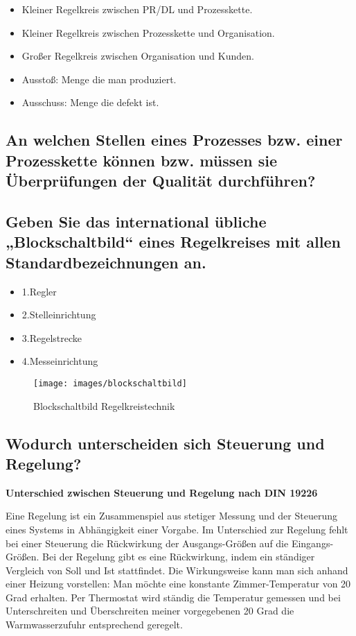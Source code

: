 	\begin{itemize}
		\item Kleiner Regelkreis zwischen PR/DL und Prozesskette.
		\item Kleiner Regelkreis zwischen Prozesskette und Organisation.
		\item Großer Regelkreis zwischen  Organisation und Kunden.
	\end{itemize}
	
	\begin{itemize}
		\item Ausstoß: Menge die man produziert.
		\item Ausschuss: Menge die defekt ist.
	\end{itemize}

	\subsection{An welchen Stellen eines Prozesses bzw. einer Prozesskette können bzw. müssen sie Überprüfungen der Qualität durchführen?}

	\subsection{Geben Sie das international übliche „Blockschaltbild“ eines Regelkreises mit allen Standardbezeichnungen an.}
	
	\begin{itemize}
		\item 1.Regler
		\item 2.Stelleinrichtung
		\item 3.Regelstrecke
		\item 4.Messeinrichtung
	\end{itemize}
	\begin{figure}[!h]
		\begin{center}
			\texttt{[image: images/blockschaltbild]}
			\caption{Blockschaltbild Regelkreistechnik}
		\end{center}
	\end{figure}

	\subsection{Wodurch unterscheiden sich Steuerung und Regelung?}

	\textbf{Unterschied zwischen Steuerung und Regelung nach DIN 19226 }
	
	Eine Regelung ist ein Zusammenspiel aus stetiger Messung und der Steuerung eines Systems in Abhängigkeit einer Vorgabe. \newline
	Im Unterschied zur Regelung fehlt bei einer Steuerung die Rückwirkung der Ausgangs-Größen auf die Eingangs-Größen. \newline
	Bei der Regelung gibt es eine Rückwirkung, indem ein ständiger Vergleich von Soll und Ist stattfindet. Die Wirkungsweise kann man sich anhand einer Heizung vorstellen: Man möchte eine konstante Zimmer-Temperatur von 20 Grad erhalten. Per Thermostat wird ständig die Temperatur gemessen und bei Unterschreiten und Überschreiten meiner vorgegebenen 20 Grad die Warmwasserzufuhr entsprechend geregelt. 
	
